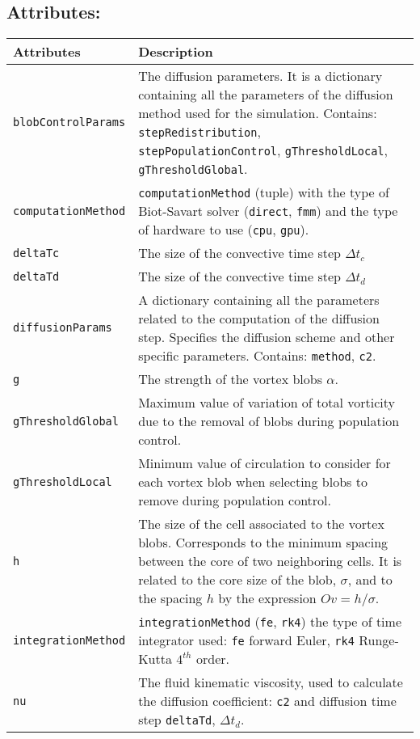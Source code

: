 \subsection*{Attributes:}
\begingroup
\footnotesize
\begin{longtable}{|l|p{9cm}|}
	\hline
	\textbf{Attributes} & \textbf{Description}\\
	\toprule
    \texttt{blobControlParams} 		& The diffusion parameters. It is a dictionary containing all the parameters of the diffusion method used for the simulation. Contains: \texttt{stepRedistribution}, \texttt{stepPopulationControl}, \texttt{gThresholdLocal}, \texttt{gThresholdGlobal}.\\\hline
    \texttt{computationMethod} 		&\texttt{computationMethod} (tuple) with the type of Biot-Savart solver (\texttt{direct}, \texttt{fmm}) and the type of hardware to use (\texttt{cpu}, \texttt{gpu}).\\\hline
    \texttt{deltaTc} & The size of the convective time step $\Delta t_c$\\\hline
    \texttt{deltaTd} & The size of the convective time step $\Delta t_d$\\\hline
    \texttt{diffusionParams} & A dictionary containing all the parameters related to the computation of the diffusion step. Specifies the diffusion scheme and other specific parameters. Contains: \texttt{method}, \texttt{c2}.\\\hline
    \texttt{g} & The strength of the vortex blobs $\alpha$.\\          \hline
    \texttt{gThresholdGlobal} & Maximum value of variation of total vorticity due to the removal of blobs during population control.\\\hline
    \texttt{gThresholdLocal} & Minimum value of circulation to consider for each vortex blob when selecting blobs to remove during population control.\\    \hline      
    \texttt{h} & The size of the cell associated to the vortex blobs. Corresponds to the minimum spacing between the core of two neighboring cells. It is related to the core size of the blob, $\sigma$, and to the spacing $h$ by the expression $Ov = h/\sigma$.\\\hline          
    \texttt{integrationMethod} & \texttt{integrationMethod} (\texttt{fe}, \texttt{rk4}) the type of time integrator used: \texttt{fe} forward Euler, \texttt{rk4} Runge-Kutta $4^{th}$ order.\\ \hline
    \texttt{nu} & The fluid kinematic viscosity, used to calculate the diffusion coefficient: \texttt{c2} and diffusion time step \texttt{deltaTd}, $\Delta t_{d}$.\\          \hline

\end{longtable}
